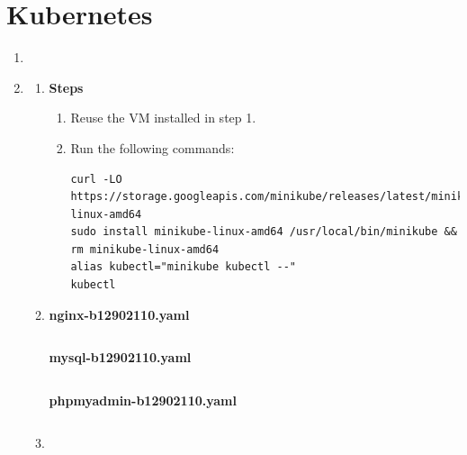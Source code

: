 \documentclass[12pt, a4paper]{article}
\begin{document}
  \section*{Kubernetes}
  \begin{enumerate}[resume]
    \item
    \item
    \begin{enumerate}
      \item
      \textbf{Steps}
      \begin{enumerate}
        \item Reuse the VM installed in step 1.
        \item Run the following commands:
        \begin{verbatim}
curl -LO https://storage.googleapis.com/minikube/releases/latest/minikube-linux-amd64
sudo install minikube-linux-amd64 /usr/local/bin/minikube && rm minikube-linux-amd64
alias kubectl="minikube kubectl --"
kubectl
        \end{verbatim}
      \end{enumerate}
      \item
      \textbf{nginx-b12902110.yaml}
      \inputminted[fontsize=\footnotesize]{yaml}{nginx-b12902110.yaml}
      \textbf{mysql-b12902110.yaml}
      \inputminted[fontsize=\footnotesize]{yaml}{mysql-b12902110.yaml}
      \textbf{phpmyadmin-b12902110.yaml}
      \inputminted[fontsize=\footnotesize]{yaml}{phpmyadmin-b12902110.yaml}






      \item
    \end{enumerate}
  \end{enumerate}
\end{document}

